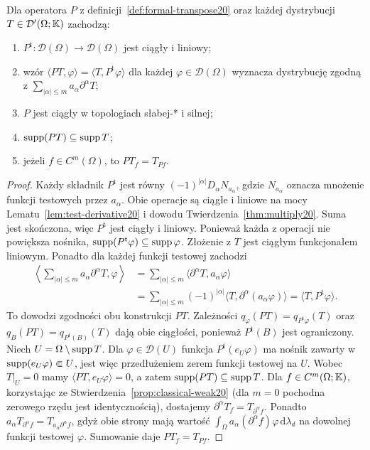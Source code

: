 \begin{twierdzenie}
\label{thm:transpose20}
Dla operatora $P$ z definicji~\ref{def:formal-transpose20}
oraz każdej dystrybucji $T\in\mathcal D'(\Omega;\mathbb K)$
zachodzą:
\begin{enumerate}
\item $P^{\mathrm t}:\mathcal D(\Omega)\to\mathcal D(\Omega)$
jest ciągły i liniowy;
\item wzór $\langle PT,\varphi\rangle=
\langle T,P^{\mathrm t}\varphi\rangle$ dla każdej
$\varphi\in\mathcal D(\Omega)$ wyznacza dystrybucję
zgodną z $\sum_{|\alpha|\le m}a_\alpha\partial^\alpha T$;
\item $P$ jest ciągły w topologiach słabej-* i silnej;
\item $\operatorname{supp}(PT)\subseteq\operatorname{supp} T$;
\item jeżeli $f\in C^m(\Omega)$, to $PT_f=T_{Pf}$.
\end{enumerate}
\end{twierdzenie}
\begin{proof}
Każdy składnik $P^{\mathrm t}$ jest równy
$(-1)^{|\alpha|}D_\alpha N_{a_\alpha}$, gdzie
$N_{a_\alpha}$ oznacza mnożenie funkcji testowych przez
$a_\alpha$. Obie operacje są ciągłe i liniowe na mocy
Lematu~\ref{lem:test-derivative20} i dowodu
Twierdzenia~\ref{thm:multiply20}. Suma jest skończona,
więc $P^{\mathrm t}$ jest ciągły i liniowy.
Ponieważ każda z operacji nie powiększa nośnika,
$\operatorname{supp}(P^{\mathrm t}\varphi)\subseteq\operatorname{supp}\varphi$.
Złożenie z $T$ jest ciągłym funkcjonałem liniowym.
Ponadto dla każdej funkcji testowej zachodzi
\[
\begin{aligned}
\left\langle\sum_{|\alpha|\le m}a_\alpha\partial^\alpha T,
\varphi\right\rangle
&=\sum_{|\alpha|\le m}\langle\partial^\alpha T,
a_\alpha\varphi\rangle\\
&=\sum_{|\alpha|\le m}(-1)^{|\alpha|}
\langle T,\partial^\alpha(a_\alpha\varphi)\rangle
=\langle T,P^{\mathrm t}\varphi\rangle.
\end{aligned}
\]
To dowodzi zgodności obu konstrukcji $PT$.
Zależności
$q_\varphi(PT)=q_{P^{\mathrm t}\varphi}(T)$ oraz
$q_B(PT)=q_{P^{\mathrm t}(B)}(T)$
dają obie ciągłości, ponieważ $P^{\mathrm t}(B)$ jest ograniczony.
Niech $U=\Omega\setminus\operatorname{supp} T$. Dla
$\varphi\in\mathcal D(U)$ funkcja $P^{\mathrm t}(e_U\varphi)$
ma nośnik zawarty w $\operatorname{supp}(e_U\varphi)\Subset U$,
jest więc przedłużeniem zerem funkcji testowej na $U$.
Wobec $T|_U=0$ mamy $\langle PT,e_U\varphi\rangle=0$,
a zatem $\operatorname{supp}(PT)\subseteq\operatorname{supp} T$.
Dla $f\in C^m(\Omega;\mathbb K)$, korzystając ze
Stwierdzenia~\ref{prop:classical-weak20} (dla $m=0$
pochodna zerowego rzędu jest identycznością), dostajemy
$\partial^\alpha T_f=T_{\partial^\alpha f}$.
Ponadto $a_\alpha T_{\partial^\alpha f}
=T_{a_\alpha\partial^\alpha f}$, gdyż obie strony mają
wartość $\int_\Omega a_\alpha(\partial^\alpha f)\varphi\,
\mathrm d\lambda_d$ na dowolnej funkcji testowej $\varphi$.
Sumowanie daje $PT_f=T_{Pf}$.
\end{proof}

